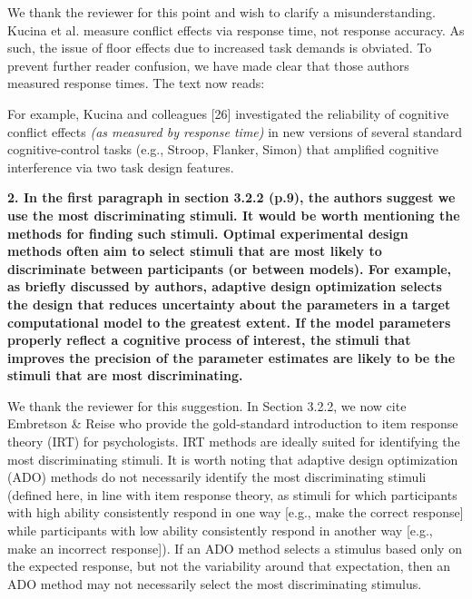 \documentclass[a4paper,12pt]{article}
\begin{document}
We thank the reviewer for this point and wish to clarify a misunderstanding. Kucina et al. measure conflict effects via response time, not response accuracy. As such, the issue of floor effects due to increased task demands is obviated. To prevent further reader confusion, we have made clear that those authors measured response times. The text now reads:

\begin{displayquote}
    For example, Kucina and colleagues [26] investigated the reliability of cognitive conflict effects \textit{(as measured by response time)} in new versions of several standard cognitive-control tasks (e.g., Stroop, Flanker, Simon) that amplified cognitive interference via two task design features.
\end{displayquote}

\textbf{2. In the first paragraph in section 3.2.2 (p.9), the authors suggest we use the most discriminating stimuli. It would be worth mentioning the methods for finding such stimuli. Optimal experimental design methods often aim to select stimuli that are most likely to discriminate between participants (or between models). For example, as briefly discussed by authors, adaptive design optimization selects the design that reduces uncertainty about the parameters in a target computational model to the greatest extent. If the model parameters properly reflect a cognitive process of interest, the stimuli that improves the precision of the parameter estimates are likely to be the stimuli that are most discriminating.}

We thank the reviewer for this suggestion. In Section 3.2.2, we now cite Embretson \& Reise \cite{embretson2013item} who provide the gold-standard introduction to item response theory (IRT) for psychologists. IRT methods are ideally suited for identifying the most discriminating stimuli. It is worth noting that adaptive design optimization (ADO) methods do not necessarily identify the most discriminating stimuli (defined here, in line with item response theory, as stimuli for which participants with high ability consistently respond in one way [e.g., make the correct response] while participants with low ability consistently respond in another way [e.g., make an incorrect response]). If an ADO method selects a stimulus based only on the expected response, but not the variability around that expectation, then an ADO method may not necessarily select the most discriminating stimulus.

\printbibliography
\end{document}
